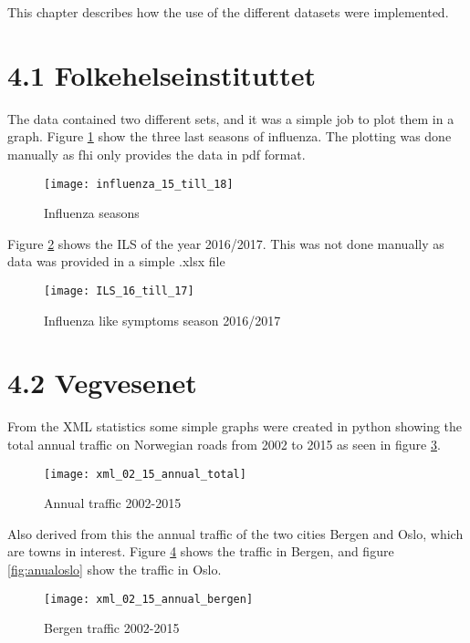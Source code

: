 This chapter describes how the use of the different datasets were implemented.

\section*{4.1 Folkehelseinstituttet}
The data contained two different sets, and it was a simple job to plot them in a graph. Figure \ref{fig:infstat} show the three last seasons of influenza. The plotting was done manually as fhi only provides the data in pdf format.

\begin{figure}[ht]
\texttt{[image: influenza\_15\_till\_18]}
\centering
\caption{Influenza seasons}
\label{fig:infstat}
\end{figure}

Figure \ref{fig:ilsstat} shows the ILS of the year 2016/2017. This was not done manually as data was provided in a simple .xlsx file 

\begin{figure}[ht]
\texttt{[image: ILS\_16\_till\_17]}
\centering
\caption{Influenza like symptoms season 2016/2017}
\label{fig:ilsstat}
\end{figure}

\newpage

\section*{4.2 Vegvesenet}
From the XML statistics some simple graphs were created in python showing the total annual traffic on Norwegian roads from 2002 to 2015 as seen in figure \ref{fig:anualtotal}. 

\begin{figure}[ht]
\texttt{[image: xml\_02\_15\_annual\_total]}
\centering
\caption{Annual traffic 2002-2015}
\label{fig:anualtotal}
\end{figure}

Also derived from this the annual traffic of the two cities Bergen and Oslo, which are towns in interest. Figure \ref{fig:anualbergen} shows the traffic in Bergen, and figure \ref{fig:anualoslo} show the traffic in Oslo.

\begin{figure}[ht]
\texttt{[image: xml\_02\_15\_annual\_bergen]}
\centering
\caption{Bergen traffic 2002-2015}
\label{fig:anualbergen}
\end{figure}


